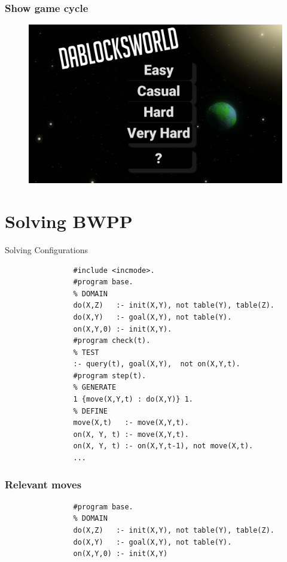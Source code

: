 \documentclass[12pt]{beamer}
\begin{document}
        \begin{frame}[fragile]
            \frametitle{Show game cycle}
            \begin{figure}
                \centering
                \includegraphics[width=\linewidth]{titleScreen.png}
                \label{titleScreen}
            \end{figure}
        \end{frame}

    \section{Solving BWPP}
        \begin{frame}[fragile]{Solving Configurations}
            \tiny
            \begin{lstlisting}
                #include <incmode>.
                #program base.
                % DOMAIN
                do(X,Z)   :- init(X,Y), not table(Y), table(Z).
                do(X,Y)   :- goal(X,Y), not table(Y).
                on(X,Y,0) :- init(X,Y).
                #program check(t).
                % TEST
                :- query(t), goal(X,Y),  not on(X,Y,t).
                #program step(t).
                % GENERATE
                1 {move(X,Y,t) : do(X,Y)} 1.
                % DEFINE
                move(X,t)   :- move(X,Y,t).
                on(X, Y, t) :- move(X,Y,t).
                on(X, Y, t) :- on(X,Y,t-1), not move(X,t).
                ...
            \end{lstlisting}
        \end{frame}
       
        \begin{frame}[fragile]
            \frametitle{Relevant moves}
            \begin{lstlisting}
                #program base.
                % DOMAIN
                do(X,Z)   :- init(X,Y), not table(Y), table(Z).
                do(X,Y)   :- goal(X,Y), not table(Y).
                on(X,Y,0) :- init(X,Y)
            \end{lstlisting}
        \end{frame} 
\end{document}
